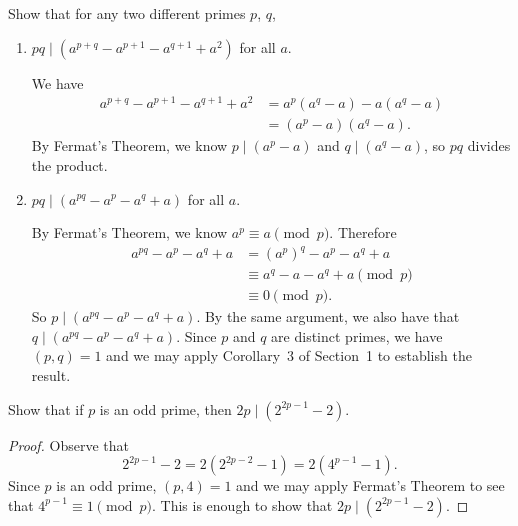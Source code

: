  Show that for any two different primes $p$, $q$,
\begin{enumerate}
\item $pq\mid(a^{p+q} - a^{p+1} - a^{q+1} + a^2)$ for all $a$.
  \begin{solution}
    We have
    \begin{align*}
      a^{p+q} - a^{p+1} - a^{q+1} + a^2
      &= a^p(a^q - a) - a(a^q - a) \\
      &= (a^p - a)(a^q - a).
    \end{align*}
    By Fermat's Theorem, we know $p\mid(a^p - a)$ and
    $q\mid(a^q - a)$, so $pq$ divides the product.
  \end{solution}
\item $pq\mid(a^{pq} - a^p - a^q + a)$ for all $a$.
  \begin{solution}
    By Fermat's Theorem, we know $a^p\equiv a\pmod{p}$. Therefore
    \begin{align*}
      a^{pq} - a^p - a^q + a
      &= (a^p)^q - a^p - a^q + a \\
      &\equiv a^q - a - a^q + a \pmod{p} \\
      &\equiv 0 \pmod{p}.
    \end{align*}
    So $p\mid(a^{pq} - a^p - a^q + a)$. By the same argument, we also
    have that $q\mid(a^{pq} - a^p - a^q + a)$. Since $p$ and $q$ are
    distinct primes, we have $(p,q) = 1$ and we may apply Corollary~3
    of Section~1 to establish the result.
  \end{solution}
\end{enumerate}

 Show that if $p$ is an odd prime, then
$2p\mid(2^{2p-1} - 2)$.
\begin{proof}
  Observe that
  \begin{equation*}
    2^{2p-1} - 2 = 2(2^{2p-2} - 1) = 2(4^{p-1} - 1).
  \end{equation*}
  Since $p$ is an odd prime, $(p,4) = 1$ and we may apply Fermat's
  Theorem to see that $4^{p-1}\equiv1\pmod{p}$. This is enough to show
  that $2p\mid(2^{2p-1} - 2)$.
\end{proof}

